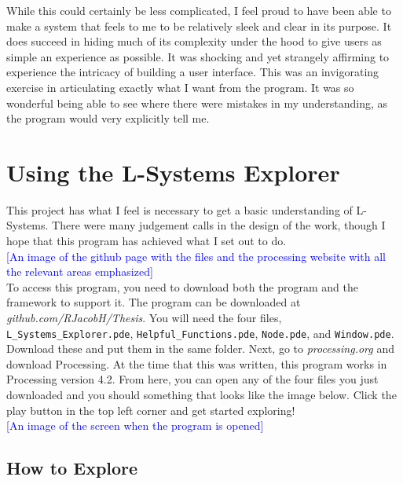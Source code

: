 \documentclass[12pt,twoside]{reedthesis}
\newcommand{\code}[1]{\texttt{#1}}
\begin{document}
	While this could certainly be less complicated, I feel proud to have been able to make a system that feels to me to be relatively sleek and clear in its purpose. It does succeed in hiding much of its complexity under the hood to give users as simple an experience as possible. It was shocking and yet strangely affirming to experience the intricacy of building a user interface. This was an invigorating exercise in articulating exactly what I want from the program. It was so wonderful being able to see where there were mistakes in my understanding, as the program would very explicitly tell me.

\section{Using the L-Systems Explorer}
\label{Using-the-L-Systems-Explorer}

	This project has what I feel is necessary to get a basic understanding of L-Systems. There were many judgement calls in the design of the work, though I hope that this program has achieved what I set out to do.\\
	
	\textcolor{blue}{[An image of the github page with the files and the processing website with all the relevant areas emphasized]}\\
	
	To access this program, you need to download both the program and the framework to support it. The program can be downloaded at \textit{github.com/RJacobH/Thesis}. You will need the four files, \code{L\_Systems\_Explorer.pde}, \code{Helpful\_Functions.pde}, \code{Node.pde}, and \code{Window.pde}. Download these and put them in the same folder. Next, go to \textit{processing.org} and download Processing. At the time that this was written, this program works in Processing version 4.2. From here, you can open any of the four files you just downloaded and you should something that looks like the image below. Click the play button in the top left corner and get started exploring!\\
	
	\textcolor{blue}{[An image of the screen when the program is opened]}
	
\subsection{How to Explore}
	
\end{document}
